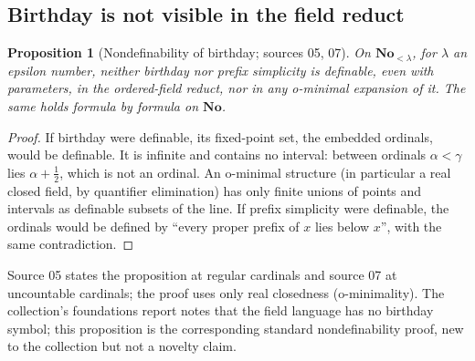 \documentclass[11pt,letterpaper]{article}
\newtheorem{proposition}[proposition]{Proposition}\aliascntresetthe{proposition}
\theoremstyle{definition}
\theoremstyle{remark}
\newcommand{\No}{\mathbf{No}}
\newcommand{\om}{\omega}
\newcommand{\card}[1]{\lvert#1\rvert}
\newcommand{\lbl}[1]{\nolinkurl{#1}}
\newcommand{\repo}[1]{\nolinkurl{#1}}
\begin{document}
\noindent[Added 2 October 2026, batch 80: the order-theoretic case of this
remark, which uses neither the field structure nor uncountability, is proved
and used in the report
\repo{foundations-and-computation/surreal-well-orders} (batch-80 manuscripts
08, 09, 11 and 12). Its Lemma~7.2 (\lbl{swo:sw:stageeta}, its source 11's)
shows, by the birthday bound \eqref{hset:eq:cut-bound}, that for every regular
infinite $\kappa$, $\kappa=\om$ included, $\No_{<\kappa}$ fills every cut
$A<B$ with $\card{A\cup B}<\kappa$, even avoiding any prescribed set of fewer
than $\kappa$ points; it calls this property $\eta_\kappa$. Its Note~7.4
(\lbl{swo:sk:prop:cutoffeta}, its source 08's Proposition~6.1) states it for
regular $\kappa$ with $2^{<\kappa}=\kappa$ and cites this remark. Its
Proposition~12.1 (\lbl{swo:sw:permutationeta}) shows that the lexicographic
order of the well-orderings of length $\kappa$ of an $\eta_\kappa$-order of
cardinality $\kappa$ is again $\eta_\kappa$; with Lemma~7.2 this applies to
$\No_{<\kappa}$ when $2^{<\kappa}=\kappa$. No result here uses that
report.]

\subsection{Birthday is not visible in the field reduct}

\begin{proposition}[Nondefinability of birthday; sources 05, 07]\label{hset:prop:nondef}
On $\No_{<\lambda}$, for $\lambda$ an epsilon number, neither birthday nor prefix
simplicity is definable, even with parameters, in the ordered-field reduct, nor
in any o-minimal expansion of it. The same holds formula by formula on $\No$.
\end{proposition}
\begin{proof}
If birthday were definable, its fixed-point set, the embedded ordinals, would
be definable. It is infinite and contains no interval: between ordinals
$\alpha<\gamma$ lies $\alpha+\tfrac12$, which is not an ordinal. An o-minimal
structure (in particular a real closed field, by quantifier elimination) has
only finite unions of points and intervals as definable subsets of the line. If
prefix simplicity were definable, the ordinals would be defined by
``every proper prefix of $x$ lies below $x$'', with the same contradiction.
\end{proof}

Source 05 states the proposition at regular cardinals and source 07 at
uncountable cardinals; the proof uses only real closedness (o-minimality). The
collection's foundations report notes that the field language has no
birthday symbol; this proposition is the corresponding standard
nondefinability proof, new to the collection but not a novelty claim.
\end{document}
